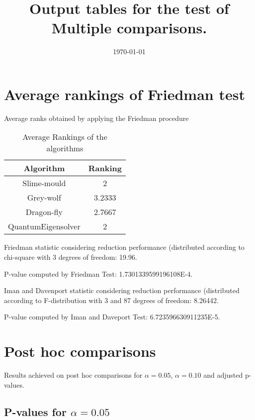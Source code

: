 \documentclass[a4paper,10pt]{article}
\title{Output tables for the test of Multiple comparisons.}
\author{}
\date{\today}
\begin{document}
\begin{landscape}
\pagestyle{empty}
\maketitle
\thispagestyle{empty}
\section{Average rankings of Friedman test}



Average ranks obtained by applying the Friedman procedure

\begin{table}[!htp]
\centering
\begin{tabular}{|c|c|}\hline
Algorithm&Ranking\\\hline
Slime-mould & 2\\
Grey-wolf & 3.2333\\
Dragon-fly & 2.7667\\
QuantumEigensolver & 2\\
\hline
\end{tabular}
\caption{Average Rankings of the algorithms}
\end{table}

Friedman statistic considering reduction performance (distributed according to chi-square with 3 degrees of freedom: 19.96.

P-value computed by Friedman Test: 1.7301339599196108E-4.\newline

Iman and Davenport statistic considering reduction performance (distributed according to F-distribution with 3 and 87 degrees of freedom: 8.26442.

P-value computed by Iman and Daveport Test: 6.723596630911235E-5.\newline



\pagebreak

\section{Post hoc comparisons}

Results achieved on post hoc comparisons for $\alpha = 0.05$, $\alpha = 0.10$ and adjusted p-values.

\subsection{P-values for $\alpha=0.05$}


\end{landscape}
\end{document}
